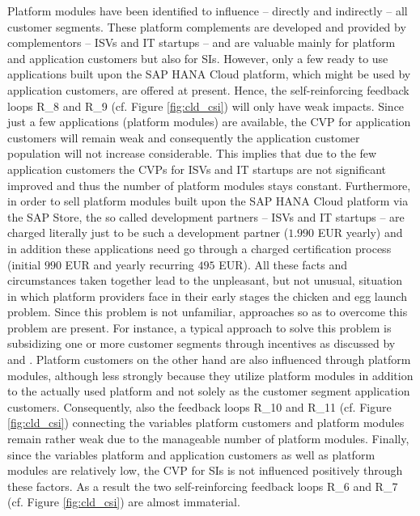 Platform modules have been identified to influence -- directly and indirectly -- all customer segments. These platform complements are developed and provided by complementors -- \acp{ISV} and \ac{IT} startups -- and are valuable mainly for platform and application customers but also for \acp{SI}. However, only a few ready to use applications built upon the SAP HANA Cloud platform, which might be used by application customers, are offered at present. Hence, the self-reinforcing feedback loops R\_8 and R\_9 (cf. Figure \ref{fig:cld_csi}) will only have weak impacts. Since just a few applications (platform modules) are available, the \ac{CVP} for application customers will remain weak and consequently the application customer population will not increase considerable. This implies that due to the few application customers the \acp{CVP} for \acp{ISV} and \ac{IT} startups are not significant improved and thus the number of platform modules stays constant. Furthermore, in order to sell platform modules built upon the SAP HANA Cloud platform via the SAP Store, the so called development partners -- \acp{ISV} and \ac{IT} startups -- are charged literally just to be such a development partner ($1.990$ \ac{EUR} yearly) and in addition these applications need go through a charged certification process (initial $990$ \ac{EUR} and yearly recurring $495$ \ac{EUR}). All these facts and circumstances taken together lead to the unpleasant, but not unusual, situation in which platform providers face in their early stages the chicken and egg launch problem. Since this problem is not unfamiliar, approaches so as to overcome this problem are present. For instance, a typical approach to solve this problem is subsidizing one or more customer segments through incentives as discussed by \citet[pp. 1,5]{Eisenmann2006} and \citet[pp. 195-196]{Evans2003}. Platform customers on the other hand are also influenced through platform modules, although less strongly because they utilize platform modules in addition to the actually used platform and not solely as the customer segment application customers. Consequently, also the feedback loops R\_10 and R\_11 (cf. Figure \ref{fig:cld_csi}) connecting the variables platform customers and platform modules remain rather weak due to the manageable number of platform modules. Finally, since the variables platform and application customers as well as platform modules are relatively low, the \ac{CVP} for \acp{SI} is not influenced positively through these factors. As a result the two self-reinforcing feedback loops R\_6 and R\_7 (cf. Figure \ref{fig:cld_csi}) are almost immaterial.

